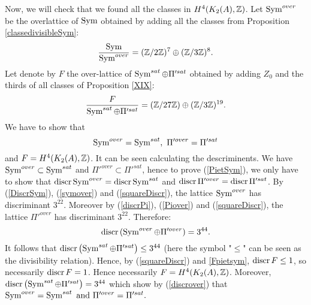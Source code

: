Now, we will check that we found all the classes in $H^4(K_{ 2 }( A ),\mathbb{Z})$.
Let $\operatorname{Sym}^{over}$ be the overlattice of $\operatorname{Sym}$ obtained by adding all the classes from Proposition \ref{classedivisibleSym}:
\begin{equation}
\frac{\operatorname{Sym}}{\operatorname{Sym}^{over}}=(\mathbb{Z}/2\mathbb{Z})^7\oplus(\mathbb{Z}/3\mathbb{Z})^8. 
\label{symover} 
\end{equation}
Let denote by $F$ the over-lattice of $\operatorname{Sym}^{sat}\oplus \Pi'^{sat}$ obtained by adding $Z_0$ and the thirds of all classes of Proposition \ref{XIX}:
\begin{equation}
\frac{F}{\operatorname{Sym}^{sat}\oplus \Pi'^{sat}}=(\mathbb{Z}/27\mathbb{Z})\oplus(\mathbb{Z}/3\mathbb{Z})^{19}.
\label{Fpietsym}
\end{equation}
We have to show that 
\begin{equation}
\operatorname{Sym}^{over}=\operatorname{Sym}^{sat},\ \Pi'^{over}=\Pi'^{sat}
\label{PietSym}
\end{equation}
and $F=H^4(K_{ 2 }( A ),\mathbb{Z})$.
It can be seen calculating the descriminents. 
We have $\operatorname{Sym}^{over}\subset \operatorname{Sym}^{sat}$ and $\Pi'^{over}\subset\Pi'^{sat}$, hence to prove (\ref{PietSym}), we only have to show that 
$\operatorname{discr} \operatorname{Sym}^{over}=\operatorname{discr} \operatorname{Sym}^{sat}$ and $\operatorname{discr} \Pi'^{over}=\operatorname{discr}\Pi'^{sat}$.
By (\ref{DiscrSym}), (\ref{symover}) and (\ref{squareDiscr}), the lattice $\operatorname{Sym}^{over}$ has discriminant $3^{22}$. Moreover by (\ref{discrPi}), (\ref{Piover}) and (\ref{squareDiscr}), 
the lattice $\Pi'^{over}$ has discriminant $3^{22}$. Therefore:
\begin{equation}
\operatorname{discr}\left(\operatorname{Sym}^{over}\oplus \Pi'^{over}\right)=3^{44}.
\label{discrover}
\end{equation}
It follows that $\operatorname{discr} \left(\operatorname{Sym}^{sat}\oplus \Pi'^{sat}\right)\leq 3^{44}$ (here the symbol "$\leq$" can be seen as the divisibility relation).
Hence, by (\ref{squareDiscr}) and \ref{Fpietsym}, $\operatorname{discr} F\leq 1$, so necessarily $\operatorname{discr} F=1$. Hence necessarily $F=H^4(K_2(A),\mathbb{Z})$. Moreover, $\operatorname{discr} \left(\operatorname{Sym}^{sat}\oplus \Pi'^{sat}\right)=3^{44}$ 
which show by (\ref{discrover}) that $\operatorname{Sym}^{over}=\operatorname{Sym}^{sat} \text{ and } \Pi'^{over}=\Pi'^{sat}.$ 

